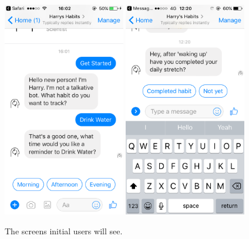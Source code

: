 \begin{figure}[H]
  \centering
  \includegraphics[width=2.1in]{../resources/design/media/5.png}
  \hspace{10px}
  \includegraphics[width=2.1in]{../resources/design/media/3.png}
  \caption{The screens initial users will see.}
  \label{fig:setup_media_2}
\end{figure}


\newpage
